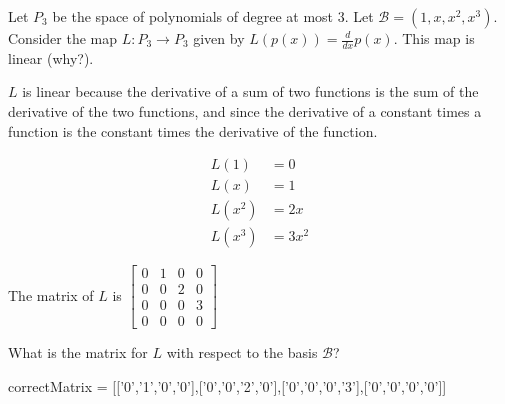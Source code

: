 \documentclass{ximera}
\begin{document}
\begin{question}
  Let $P_3$ be the space of polynomials of degree at most $3$.  Let $\mathcal{B} = (1,x,x^2,x^3)$.  Consider the map $L:P_3 \to P_3$ given by 
  $L(p(x)) = \frac{d}{dx} p(x)$. This map is linear (why?).  
  \begin{solution}
    \begin{hint}
      $L$ is linear because the derivative of a sum of two functions is the sum of the derivative of the two functions, and since the derivative of a constant
      times a function is the constant times the derivative of the function.
    \end{hint}
    \begin{hint}
      \begin{align*}
        L(1) &=0\\
        L(x) &=1\\
        L(x^2)&=2x\\
        L(x^3)&=3x^2
      \end{align*}
    \end{hint}
    \begin{hint}
      The matrix of $L$ is \(\begin{bmatrix} 0&1&0&0\\0&0&2&0\\0&0&0&3\\0&0&0&0\end{bmatrix}\)
    \end{hint}
    What is the matrix for $L$ with respect to the basis $\mathcal{B}$?
    \begin{matrix-answer}
      correctMatrix = [['0','1','0','0'],['0','0','2','0'],['0','0','0','3'],['0','0','0','0']]
    \end{matrix-answer}
  \end{solution}
\end{question}
\end{document}
